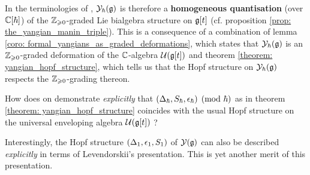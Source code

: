         \begin{remark}
            In the terminologies of \cite{wendlandt_restricted_quantum_doubles_of_yangians}, $\mathcal{Y}_{\hbar}(\mathfrak{g})$ is therefore a \textbf{homogeneous quantisation} (over $\mathbb{C}[\hbar]$) of the $\mathbb{Z}_{\geqslant 0}$-graded Lie bialgebra structure on $\mathfrak{g}[t]$ (cf. proposition \ref{prop: the_yangian_manin_triple}). This is a consequence of a combination of lemma \ref{coro: formal_yangians_as_graded_deformations}, which states that $\mathcal{Y}_{\hbar}(\mathfrak{g})$ is an $\mathbb{Z}_{\geqslant 0}$-graded deformation of the $\mathbb{C}$-algebra $\mathcal{U}(\mathfrak{g}[t])$ and theorem \ref{theorem: yangian_hopf_structure}, which tells us that the Hopf structure on $\mathcal{Y}_{\hbar}(\mathfrak{g})$ respects the $\mathbb{Z}_{\geqslant 0}$-grading thereon. 
        \end{remark}
        \begin{question}
            How does on demonstrate \textit{explicitly} that $(\Delta_{\hbar}, S_{\hbar}, \epsilon_{\hbar}) \pmod{\hbar}$ as in theorem \ref{theorem: yangian_hopf_structure} coincides with the usual Hopf structure on the universal enveloping algebra $\mathcal{U}(\mathfrak{g}[t])$ ?
        \end{question}
        Interestingly, the Hopf structure $(\Delta_1, \epsilon_1, S_1)$ of $\mathcal{Y}(\mathfrak{g})$ can also be described \textit{explicitly} in terms of Levendorskii's presentation. This is yet another merit of this presentation. 
